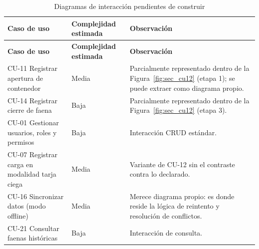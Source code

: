 {\estilotabla
\begin{longtable}{L{0.34\textwidth} C{0.18\textwidth} L{0.42\textwidth}}

\caption{Diagramas de interacción pendientes de construir}
\label{tab:interacciones_pendientes}
\\

\toprule
\textbf{Caso de uso} & \textbf{Complejidad estimada} & \textbf{Observación} \\
\midrule
\endfirsthead

\toprule
\textbf{Caso de uso} & \textbf{Complejidad estimada} & \textbf{Observación} \\
\midrule
\endhead

CU-11 Registrar apertura de contenedor & Media &
Parcialmente representado dentro de la Figura~\ref{fig:sec_cu12} (etapa 1); se puede extraer como
diagrama propio. \\
\midrule

CU-14 Registrar cierre de faena & Baja &
Parcialmente representado dentro de la Figura~\ref{fig:sec_cu12} (etapa 3). \\
\midrule

CU-01 Gestionar usuarios, roles y permisos & Baja &
Interacción CRUD estándar. \\
\midrule

CU-07 Registrar carga en modalidad tarja ciega & Media &
Variante de CU-12 sin el contraste contra lo declarado. \\
\midrule

CU-16 Sincronizar datos (modo offline) & Media &
Merece diagrama propio: es donde reside la lógica de reintento y resolución de conflictos. \\
\midrule

CU-21 Consultar faenas históricas & Baja &
Interacción de consulta. \\

\bottomrule

\end{longtable}
}
